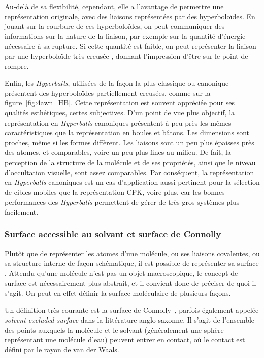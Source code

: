 	Au-delà de sa flexibilité, cependant, elle a l'avantage de permettre une représentation originale, avec des liaisons représentées par des hyperboloïdes. En jouant sur la courbure de ces hyperboloïdes, on peut communiquer des informations sur la nature de la liaison, par exemple sur la quantité d'énergie nécessaire à sa rupture. Si cette quantité est faible, on peut représenter la liaison par une hyperboloïde très \og creusée \fg{}, donnant l'impression d'être sur le point de rompre.
		
	Enfin, les \emph{Hyperballs}, utilisées de la façon la plus \og classique \fg{} ou \og canonique \fg{} présentent des hyperboloïdes partiellement creusées, comme sur la figure~\ref{fig:4awn_HB}. Cette représentation est souvent appréciée pour ses qualités esthétiques, certes subjectives. D'un point de vue plus objectif, la représentation en \emph{Hyperballs} canoniques présentent à peu près les mêmes caractéristiques que la représentation en boules et bâtons. Les dimensions sont proches, même si les formes diffèrent. Les liaisons sont un peu plus épaisses près des atomes, et comparables, voire un peu plus fines au milieu. De fait, la perception de la structure de la molécule et de ses propriétés, ainsi que le niveau d'occultation visuelle, sont assez comparables. Par conséquent, la représentation en \emph{Hyperballs} canoniques est un cas d'application aussi pertinent pour la sélection de cibles mobiles que la représentation CPK, voire plus, car les bonnes performances des \emph{Hyperballs} permettent de gérer de très gros systèmes plus facilement.
	
	\subsubsection{Surface accessible au solvant et surface de Connolly}
	Plutôt que de représenter les atomes d'une molécule, ou ses liaisons covalentes, ou sa structure interne de façon schématique, il est possible de représenter sa \og surface \fg{}. Attendu qu'une molécule n'est pas un objet macroscopique, le concept de surface est nécessairement plus abstrait, et il convient donc de préciser de quoi il s'agit. On peut en effet définir la surface moléculaire de plusieurs façons.
		
	Un définition très courante est la surface de Connolly~\cite{connolly1983analytical}, parfois également appelée \emph{solvent excluded surface} dans la littérature anglo-saxonne. Il s'agit de l'ensemble des points auxquels la molécule et \og le solvant \fg{} (généralement une sphère représentant une molécule d'eau) peuvent entrer en contact, où le contact est défini par le rayon de van der Waals.
	
